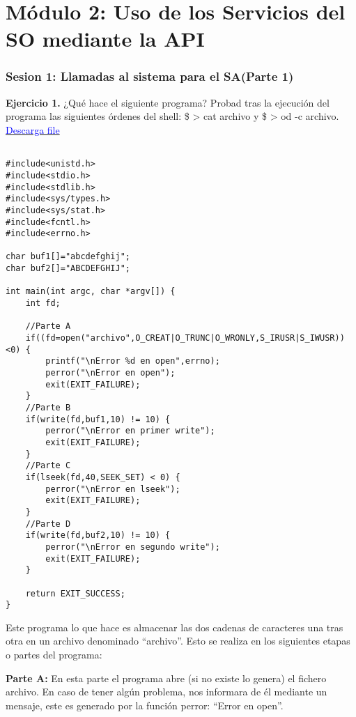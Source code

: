 \listoffigures

\listoftables

\newpage

\part[Módulo 2]{Módulo 2: Uso de los Servicios del SO mediante la API}

\section[Sesion 1]{Sesion 1: Llamadas al sistema para el SA(Parte 1)}

{\Large \textbf{Ejercicio 1.}} ¿Qué hace el siguiente programa? Probad tras la ejecución del programa las siguientes órdenes del shell: \$ > cat archivo y \$ > od -c archivo. \href{file: file/tarea1.c}{\textcolor{Blue}{Descarga file}}


\lstset{language=C, breaklines=true, basicstyle=\footnotesize}
\begin{lstlisting}[frame=single]

#include<unistd.h>
#include<stdio.h>
#include<stdlib.h>
#include<sys/types.h>  	
#include<sys/stat.h>
#include<fcntl.h>
#include<errno.h>

char buf1[]="abcdefghij";
char buf2[]="ABCDEFGHIJ";

int main(int argc, char *argv[]) {
	int fd;
	
	//Parte A
	if((fd=open("archivo",O_CREAT|O_TRUNC|O_WRONLY,S_IRUSR|S_IWUSR))<0) {
		printf("\nError %d en open",errno);
		perror("\nError en open");
		exit(EXIT_FAILURE);
	}
	//Parte B
	if(write(fd,buf1,10) != 10) {
		perror("\nError en primer write");
		exit(EXIT_FAILURE);
	}
	//Parte C
	if(lseek(fd,40,SEEK_SET) < 0) {
		perror("\nError en lseek");
		exit(EXIT_FAILURE);
	}
	//Parte D
	if(write(fd,buf2,10) != 10) {
		perror("\nError en segundo write");
		exit(EXIT_FAILURE);
	}

	return EXIT_SUCCESS;
}

\end{lstlisting}

Este programa lo que hace es almacenar las dos cadenas de caracteres una tras otra en un archivo denominado ``archivo''. Esto se realiza en los siguientes etapas o partes del programa: \newline

\textbf{Parte A:} En esta parte el programa abre (si no existe lo genera) el fichero archivo. En caso de tener algún problema, nos informara de él mediante un mensaje, este es generado por la función perror: ``Error en open''.\newline

